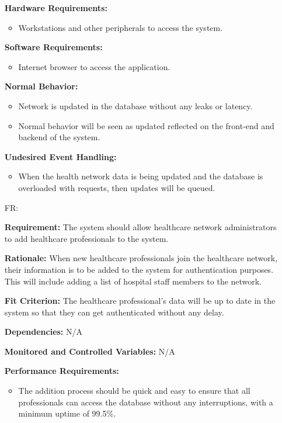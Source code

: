 \documentclass[12pt]{article}
\newcounter{reqnum} %
\begin{document}
\begin{itemize}
\textbf{Hardware Requirements:} 
\begin{itemize}
  \item Workstations and other peripherals to access the system.
\end{itemize}

\textbf{Software Requirements:} 
\begin{itemize}
  \item Internet browser to access the application.
\end{itemize}

\textbf{Normal Behavior:}
\begin{itemize}
  \item Network is updated in the database without any leaks or latency.
  \item Normal behavior will be seen as updated reflected on the front-end and backend of the system.
\end{itemize} 

\textbf{Undesired Event Handling:} 
\begin{itemize}
  \item When the health network data is being updated and the database is overloaded with requests, then updates will be queued.
\end{itemize}

\item[FR\refstepcounter{reqnum}\thereqnum \label{FR_AddHealthProfessional}:]

\textbf{Requirement:} The system should allow healthcare network administrators to add healthcare professionals to the system.

\textbf{Rationale:} When new healthcare professionals join the healthcare network, their information is to be added to the system for authentication purposes. This will include adding a list of hospital staff members to the network.

\textbf{Fit Criterion:} The healthcare professional's data will be up to date in the system so that they can get authenticated without any delay. 

\textbf{Dependencies:} N/A 

\textbf{Monitored and Controlled Variables:} N/A

\textbf{Performance Requirements:} 
\begin{itemize}
  \item The addition process should be quick and easy to ensure that all professionals can access the database without any interruptions, with a minimum uptime of 99.5\%.
\end{itemize}


\end{itemize}
\end{document}
